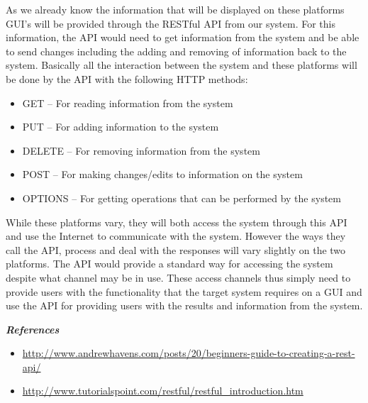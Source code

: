 \documentclass{article}
\begin{document}
As we already know the information that will be displayed on these platforms GUI’s will be provided through the RESTful API from our system. For this information, the API would need to get information from the system and be able to send changes including the adding and removing of information back to the system. Basically all the interaction between the system and these platforms will be done by the API with the following HTTP methods:
\begin{itemize}
	\item GET – For reading information from the system
	\item PUT – For adding information to the system
	\item DELETE – For removing information from the system
	\item POST – For making changes/edits to information on the system
	\item OPTIONS – For getting operations that can be performed by the system
\end{itemize}

While these platforms vary, they will both access the system through this API and use the Internet to communicate with the system. However the ways they call the API, process and deal with the responses will vary slightly on the two platforms. The API would provide a standard way for accessing the system despite what channel may be in use. These access channels thus simply need to provide users with the functionality that the target system requires on a GUI and use the API for providing users with the results and information from the system.

\emph{\textbf{References}}

\begin{itemize}
	\item \url{http://www.andrewhavens.com/posts/20/beginners-guide-to-creating-a-rest-api/}
	\item \url{http://www.tutorialspoint.com/restful/restful_introduction.htm}
\end{itemize}
\end{document}
